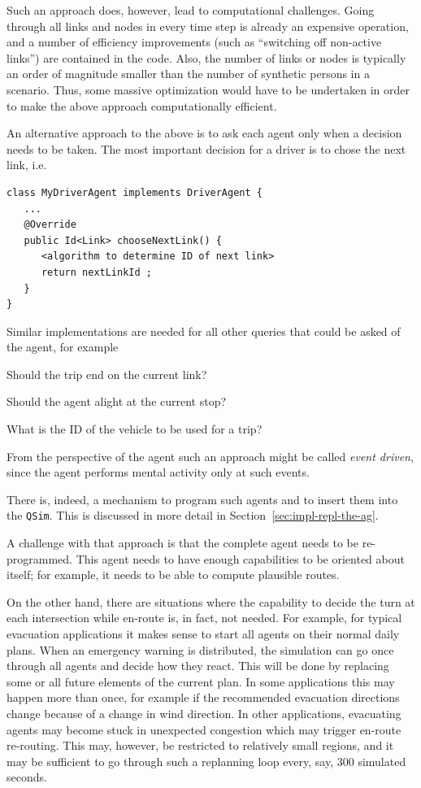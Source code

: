 Such an approach does, however, lead to computational challenges.  Going through all links and nodes in every time step is already an expensive operation, and a number of efficiency improvements (such as ``switching off non-active links'') are contained in the code.  Also, the number of links or nodes is typically an order of magnitude smaller than the number of synthetic persons in a scenario.  Thus, some massive optimization would have to be undertaken in order to make the above approach computationally efficient.

An alternative approach to the above is to ask each agent only when a decision needs to be taken.  The most important decision for a driver is to chose the next link, i.e.
\begin{lstlisting}
class MyDriverAgent implements DriverAgent {
   ...
   @Override
   public Id<Link> chooseNextLink() {
      <algorithm to determine ID of next link>
      return nextLinkId ;
   }
}
\end{lstlisting}
Similar implementations are needed for all other queries that could be asked of the agent, for example
\begin{compactitem}

\item Should the trip end on the current link?

\item Should the agent alight at the current stop?

\item What is the ID of the vehicle to be used for a trip?

\end{compactitem}
From the perspective of the agent such an approach might be called \emph{event driven}, since the agent performs mental activity only at such events.

There is, indeed, a mechanism to program such agents and to insert
them into the \lstinline$QSim$.  This is discussed in more detail in
Section~\ref{sec:impl-repl-the-ag}.

A challenge with that approach is that the complete agent needs to be re-programmed.  This agent needs to have enough capabilities to be oriented about itself; for example, it needs to be able to compute plausible routes.

On the other hand, there are situations where the capability to decide the turn at each intersection while en-route is, in fact, not needed.  
%
For example, for typical evacuation applications it makes sense to start all agents on their normal daily plans.  When an emergency warning is distributed, the simulation can go once through all agents and decide how they react.  This will be done by replacing some or all future elements of the current plan.  In some applications this may happen more than once, for example if the recommended evacuation directions change because of a change in wind direction.  In other applications, evacuating agents may become stuck in unexpected congestion which may trigger en-route re-routing.  This may, however, be restricted to relatively small regions, and it may be sufficient to go through such a replanning loop every, say, 300 simulated seconds. 

